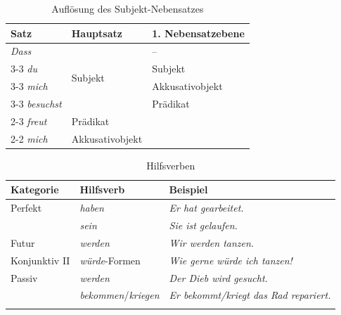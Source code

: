 \begin{table}[!htbp]
  \centering
  \begin{tabular}{l|l|l}
    {Satz} & \textbf{Hauptsatz} & \textbf{1. Nebensatzebene} \\
    \hline
    \textit{Dass} & \multirow{4}{*}{Subjekt} & -- \\ \cline{3-3}
    \textit{du} & & Subjekt \\ \cline{3-3}
    \textit{mich} & & Akkusativobjekt \\ \cline{3-3}
    \textit{besuchst} & & Prädikat  \\ \cline{2-3}
    \textit{freut} & Prädikat &  \\ \cline{2-2} 
    \textit{mich} & Akkusativobjekt &  \\  
    \hline 
  \end{tabular}
  \caption{Auflösung des Subjekt-Nebensatzes}
  \label{tab:SubjNS}
\end{table}


\begin{table}[!htbp]
  \centering
  \begin{tabular}{l|l|l}
    \lsptoprule
    \textbf{Kategorie} & \textbf{Hilfsverb} & \textbf{Beispiel} \\
    \hline
    Perfekt & \textit{haben} & \textit{Er hat gearbeitet.}\\
    & \textit{sein} & \textit{Sie ist gelaufen.} \\
    Futur & \textit{werden} & \textit{Wir werden tanzen.}\\
    Konjunktiv II & \textit{würde}-Formen & \textit{Wie gerne würde ich tanzen!} \\ 
    Passiv & \textit{werden} & \textit{Der Dieb wird gesucht.}\\  
    & \textit{bekommen}/\textit{kriegen} & \textit{Er bekommt/kriegt das Rad repariert.}\\ 
    \lspbottomrule 
  \end{tabular}
  \caption{Hilfsverben}
  \label{tab:Hilfsverben}
\end{table}



